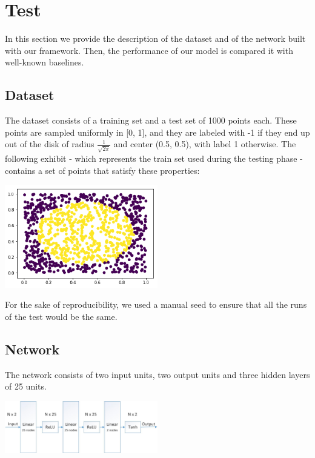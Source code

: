 \documentclass[10pt,conference,compsocconf]{IEEEtran}
\begin{document}
\section{Test}
In this section we provide the description of the dataset and of the network built with our framework. Then, the performance of our model is compared it with well-known baselines.

\subsection{Dataset}
The dataset consists of a training set and a test set of 1000 points each. These points are sampled uniformly in [0, 1], and they are labeled with -1 if they end up out of the disk of radius \( \frac{1}{\sqrt{2\pi}} \) and center (0.5, 0.5), with label 1 otherwise. The following exhibit - which represents the train set used during the testing phase - contains a set of points that satisfy these properties:

\begin{center}
	\captionsetup{type=figure}
	\includegraphics[width=0.5\textwidth]{img/dataset.png}
	\label{fig:dataset}
\end{center} 

For the sake of reproducibility, we used a manual seed to ensure that all the runs of the test would be the same.

\subsection{Network}
The network consists of two input units, two output units and three hidden layers of 25 units.

\begin{center}
	\captionsetup{type=figure}
	\includegraphics[width=0.5\textwidth]{img/Network.jpg}
	\label{fig:network}
\end{center} 
\end{document}
